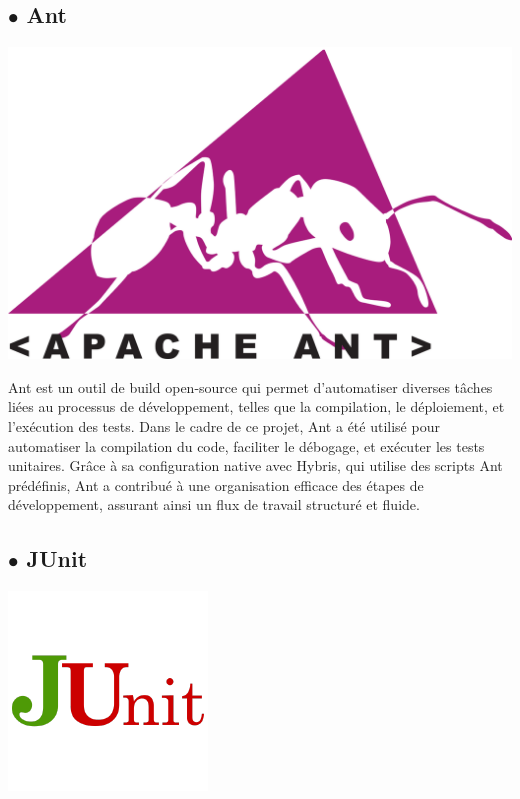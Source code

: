 \subsection*{$\bullet$ Ant}
\begin{center}
    \centering
    \includegraphics[scale=0.05]{Figures/Ant.png}
\end{center}

Ant est un outil de build open-source qui permet d'automatiser diverses tâches liées au processus de développement, telles que la compilation, le déploiement, et l'exécution des tests. Dans le cadre de ce projet, Ant a été utilisé pour automatiser la compilation du code, faciliter le débogage, et exécuter les tests unitaires. Grâce à sa configuration native avec Hybris, qui utilise des scripts Ant prédéfinis, Ant a contribué à une organisation efficace des étapes de développement, assurant ainsi un flux de travail structuré et fluide.
\subsection*{$\bullet$ JUnit}
\begin{center}
    \centering
    \includegraphics[scale=0.5]{Figures/junit.png}
    \label{fig:processus}
\end{center}

